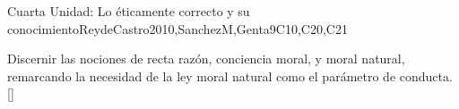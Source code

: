 \begin{syllabus}
\begin{unit}{}{Cuarta Unidad: Lo éticamente correcto y su conocimiento}{ReydeCastro2010,SanchezM,Genta}{9}{C10,C20,C21}
\begin{learningoutcomes}
	\item Discernir las nociones de recta razón, conciencia moral, y moral natural, remarcando la necesidad de la ley moral natural como el parámetro de conducta.[\Familiarity]
\end{learningoutcomes}
\end{unit}



\begin{coursebibliography}
\end{coursebibliography}

\end{syllabus}
